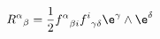 \begin{equation}
{R^\alpha}_\beta={1\over 2}{f^\alpha}_{\beta i}{f^i}_{\gamma\delta}
\e^\gamma\wedge\e^\delta
\end{equation}

